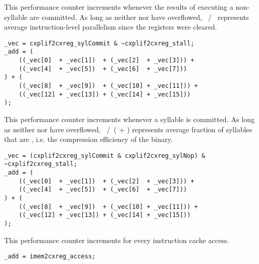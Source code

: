 This performance counter increments whenever the results of executing a 
non- syllable are committed. As long as neither  nor 
 have overflowed, ~/~ represents average 
instruction-level parallelism since the registers were cleared.

\declaration{}
\implementation{}
\begin{lstlisting}
_vec = cxplif2cxreg_sylCommit & ~cxplif2cxreg_stall;
_add = (
    ((_vec[0]  + _vec[1])  + (_vec[2]  + _vec[3])) +
    ((_vec[4]  + _vec[5])  + (_vec[6]  + _vec[7]))
) + (
    ((_vec[8]  + _vec[9])  + (_vec[10] + _vec[11])) +
    ((_vec[12] + _vec[13]) + (_vec[14] + _vec[15]))
);
\end{lstlisting}


This performance counter increments whenever a  syllable is committed. 
As long as neither  nor  have overflowed, 
~/~( + ) represents average fraction of syllables 
that are , i.e. the compression efficiency of the binary.

\declaration{}
\implementation{}
\begin{lstlisting}
_vec = (cxplif2cxreg_sylCommit & cxplif2cxreg_sylNop) & ~cxplif2cxreg_stall;
_add = (
    ((_vec[0]  + _vec[1])  + (_vec[2]  + _vec[3])) +
    ((_vec[4]  + _vec[5])  + (_vec[6]  + _vec[7]))
) + (
    ((_vec[8]  + _vec[9])  + (_vec[10] + _vec[11])) +
    ((_vec[12] + _vec[13]) + (_vec[14] + _vec[15]))
);
\end{lstlisting}


This performance counter increments for every instruction cache access.

\implementation{}
\begin{lstlisting}
_add = imem2cxreg_access;
\end{lstlisting}

